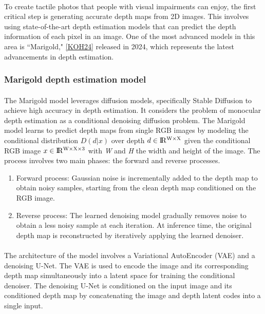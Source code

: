 \documentclass[12pt, letterpaper]{article}
\begin{document}
\begin{spacing}{1.15}
\paragraph{}
To create tactile photos that people with visual impairments can enjoy, the first critical step is generating accurate depth maps from 2D images. This involves using
state-of-the-art depth estimation models that can predict the depth information of each pixel in an image. One of the most advanced models in this area is ``Marigold," \hyperlink{KOH24target}{[KOH24]}
released in 2024, which represents the latest advancements in depth estimation.

\subsubsection{Marigold depth estimation model}
\paragraph{}
The Marigold model leverages diffusion models, specifically Stable Diffusion to achieve high accuracy in depth estimation. It considers the problem of monocular depth estimation as
a conditional denoising diffusion problem. The Marigold model learns to predict depth maps from single RGB images by modeling the conditional distribution \(D(d|x)\) over depth \(d \in \rm I\!R ^{W\times X}\)
given the conditional RGB image \(x \in \rm I\!R^{W\times X \times 3}\) with \textit{W} and \textit{H} the width and height of the image.
The process involves two main phases: the forward and reverse processes.
\begin{enumerate}
    \item Forward process: Gaussian noise is incrementally added to the depth map to obtain noisy samples, starting from the clean depth map conditioned on the RGB image.
    \item Reverse process: The learned denoising model gradually removes noise to obtain a less noisy sample at each iteration. At inference time, the original depth map is 
reconstructed by iteratively applying the learned denoiser.
\end{enumerate}

\paragraph{}
The architecture of the model involves a Variational AutoEncoder (VAE) and a denoising U-Net. The VAE is used to encode the image and its corresponding depth map simultaneously into
a latent space for training the conditional denoiser. The denoising U-Net is conditioned on the input image and its conditioned depth map by concatenating the image and depth latent
codes into a single input.

\end{spacing}
\end{document}
